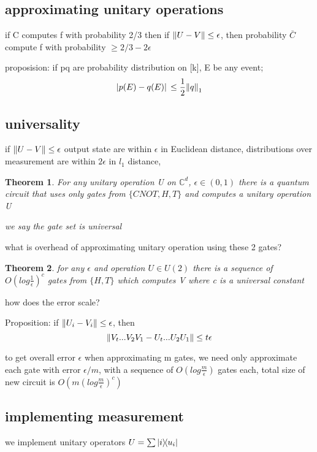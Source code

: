 \documentclass[10pt]{article}
\newcommand{\complex}{{\mathbb C}}
\theoremstyle{break}
\newtheorem{thm}{Theorem}[subsection]
\begin{document}
    \subsection{approximating unitary operations}
        if C computes f with probability 2/3 then if $\norm{U-V}\leq \epsilon$,
        then probability $\bar C$ compute f with probability $\geq 2/3-2\epsilon$
        
        proposision:
        if pq are probability distribution on [k], E be any event;
        $$\abs*{p(E)-q(E)}\leq \frac{1}{2}\norm{q}_1$$

    \subsection{universality}
        if $\norm{U-V}\leq \epsilon$
        output state are within $\epsilon$ in Euclidean distance,
        distributions over measurement are within $2\epsilon$ in $l_1$ distance,

        \begin{thm}
            For any unitary operation U on $\complex^d$,
            $\epsilon \in (0,1)$ there is a quantum circuit that uses only 
            gates from $\{CNOT, H, T\}$  and computes a unitary operation U

            we say the gate set is universal
        \end{thm}


        what is overhead of approximating unitary operation using these 2 gates?

        \begin{thm}
            for any $\epsilon$ and operation $U\in U(2)$ there is 
            a sequence of $O(log\frac{1}{\epsilon})^c$ gates from $\{H, T\}$
            which computes V where c is a universal constant
        \end{thm}

        how does the error scale?

        Proposition: if $\norm{U_i-V_i}\leq \epsilon$, then 
        $$\norm{V_t...V_2V_1-U_t...U_2U_1}\leq t\epsilon$$

        to get overall error $\epsilon$ when approximating m gates, we need 
        only approximate each gate with error $\epsilon/m$, with a sequence of 
        $O(log\frac{m}{\epsilon})$ gates each, total size of new circuit is 
        $O(m(log\frac{m}{\epsilon})^c)$
    \subsection{implementing measurement}
        we implement unitary operators $U=\sum \ketbra{i}{u_i}$
\end{document}
